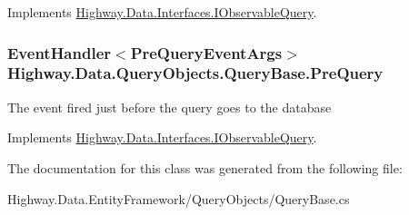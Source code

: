 Implements \hyperlink{interface_highway_1_1_data_1_1_interfaces_1_1_i_observable_query_ac8cff5ce936c3611f965796ba9707c49}{Highway.\-Data.\-Interfaces.\-I\-Observable\-Query}.

\hypertarget{class_highway_1_1_data_1_1_query_objects_1_1_query_base_a0f4a7c6fcd8e32c461633855ed00f824}{
\subsubsection[{Pre\-Query}]{\setlength{\rightskip}{0pt plus 5cm}Event\-Handler$<${\bf Pre\-Query\-Event\-Args}$>$ Highway.\-Data.\-Query\-Objects.\-Query\-Base.\-Pre\-Query}}\label{class_highway_1_1_data_1_1_query_objects_1_1_query_base_a0f4a7c6fcd8e32c461633855ed00f824}


The event fired just before the query goes to the database 



Implements \hyperlink{interface_highway_1_1_data_1_1_interfaces_1_1_i_observable_query_a1687e8dccf74ef87f98fe8ef6f1c99c3}{Highway.\-Data.\-Interfaces.\-I\-Observable\-Query}.



The documentation for this class was generated from the following file\-:\begin{DoxyCompactItemize}
\item 
Highway.\-Data.\-Entity\-Framework/\-Query\-Objects/Query\-Base.\-cs\end{DoxyCompactItemize}
